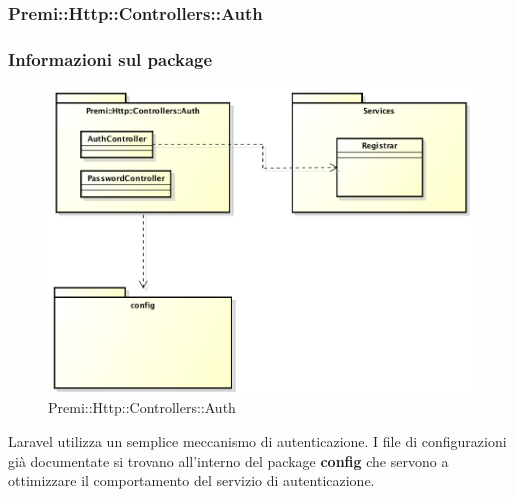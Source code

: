 	\subsubsection*{Premi::Http::Controllers::Auth}
		\subsubsection*{Informazioni sul package}
		\begin{figure}[h]
			\centering
			\includegraphics[width=0.9\linewidth]{img/premi_http_controllers_auth}
			\caption[Premi::Http::Controllers::Auth]{Premi::Http::Controllers::Auth}
			\label{fig:premi_http_controllers_auth}
		\end{figure}
	Laravel utilizza un semplice meccanismo di autenticazione. I file di configurazioni già documentate si trovano all'interno del package \textbf{config} che servono a ottimizzare il comportamento del servizio di autenticazione.		
